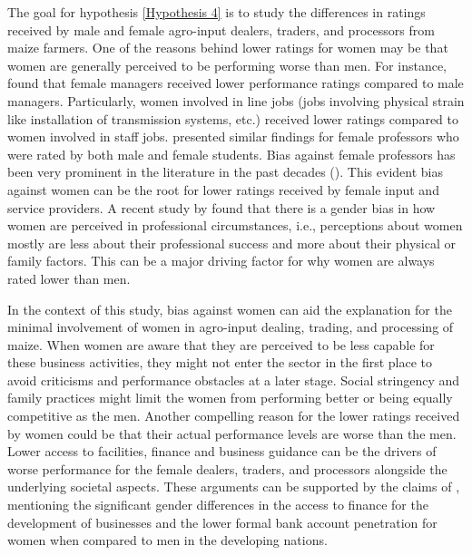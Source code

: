 \documentclass[12pt,english]{article}\usepackage[]{graphicx}\usepackage[]{color}
\begin{document}
\begin{onehalfspace}
The goal for hypothesis \ref{Hypothesis 4} is to study the differences
in ratings received by male and female agro-input dealers, traders,
and processors from maize farmers. One of the reasons behind lower
ratings for women may be that women are generally perceived to be
performing worse than men. For instance, \citet{lyness2006} found
that female managers received lower performance ratings compared to
male managers. Particularly, women involved in line jobs (jobs involving
physical strain like installation of transmission systems, etc.) received
lower ratings compared to women involved in staff jobs. \citet{basow1987}
presented similar findings for female professors who were rated by
both male and female students. Bias against female professors has
been very prominent in the literature in the past decades (\citealp{Feldman1993,Mengel2018,miller2000}).
This evident bias against women can be the root for lower ratings
received by female input and service providers. A recent study by
\citet{Wu2020} found that there is a gender bias in how women are
perceived in professional circumstances, i.e., perceptions about women
mostly are less about their professional success and more about their
physical or family factors. This can be a major driving factor for
why women are always rated lower than men. 

In the context of this study, bias against women can aid the explanation
for the minimal involvement of women in agro-input dealing, trading,
and processing of maize. When women are aware that they are perceived
to be less capable for these business activities, they might not enter
the sector in the first place to avoid criticisms and performance
obstacles at a later stage. Social stringency and family practices
might limit the women from performing better or being equally competitive
as the men. Another compelling reason for the lower ratings received
by women could be that their actual performance levels are worse than
the men. Lower access to facilities, finance and business guidance
can be the drivers of worse performance for the female dealers, traders,
and processors alongside the underlying societal aspects. These arguments
can be supported by the claims of \citet{niethammer2013}, mentioning
the significant gender differences in the access to finance for the
development of businesses and the lower formal bank account penetration
for women when compared to men in the developing nations. 


\end{onehalfspace}
\end{document}
